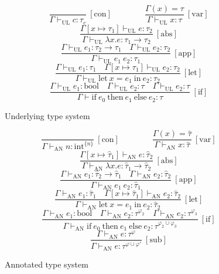\documentclass[a4paper]{report}
\begin{document}
\begin{figure}[p]
\[\frac{}{\Gamma \vdash_{\mathrm{UL}} c : \tau_c}\ \mathrm{[con]} \quad\quad\quad\quad
\frac{\Gamma(x) = \tau}{\Gamma \vdash_{\mathrm{UL}} x : \tau}\ \mathrm{[var]}\]
\[\frac{\Gamma[x \mapsto \tau_1] \vdash_{\mathrm{UL}} e : \tau_2}{\Gamma \vdash_{\mathrm{UL}} \lambda x. e : \tau_1 \to \tau_2}\ \mathrm{[abs]}\]
\[\frac{\Gamma \vdash_{\mathrm{UL}} e_1 : \tau_2 \to \tau_1 \quad \Gamma \vdash_{\mathrm{UL}} e_2 : \tau_2}{\Gamma \vdash_{\mathrm{UL}} e_1\ e_2 : \tau_1}\ \mathrm{[app]}\]
\[\frac{\Gamma \vdash_{\mathrm{UL}} e_1 : \tau_1 \quad \Gamma[x\mapsto \tau_1] \vdash_{\mathrm{UL}} e_2 : \tau_2}{\Gamma \vdash_{\mathrm{UL}} \mathrm{let\ } x = e_1 \mathrm{\ in\ } e_2 : \tau_2}\ \mathrm{[let]}\]
\[\frac{\Gamma \vdash_{\mathrm{UL}} e_1 : \mathrm{bool} \quad \Gamma \vdash_{\mathrm{UL}} e_2 : \tau \quad \Gamma \vdash_{\mathrm{UL}} e_2 : \tau}{\Gamma \vdash \mathrm{if\ } e_0 \mathrm{\ then\ } e_1 \mathrm{\ else \ } e_2 : \tau}\ \mathrm{[if]}\]
\caption{Underlying type system}
\label{underlying}
\end{figure}

\begin{figure}[p]
\[\frac{}{\Gamma \vdash_{\mathrm{AN}} n : \mathrm{int}^{\{n\}}}\ \mathrm{[con]} \quad\quad\quad\quad
\frac{\Gamma(x) = \widehat\tau}{\Gamma \vdash_{\mathrm{AN}} x : \widehat\tau}\ \mathrm{[var]}\]
\[\frac{\Gamma[x \mapsto \widehat\tau_1] \vdash_{\mathrm{AN}} e : \widehat\tau_2}{\Gamma \vdash_{\mathrm{AN}} \lambda x. e : \widehat\tau_1 \to \widehat\tau_2}\ \mathrm{[abs]}\]
\[\frac{\Gamma \vdash_{\mathrm{AN}} e_1 : \widehat\tau_2 \to \widehat\tau_1 \quad \Gamma \vdash_{\mathrm{AN}} e_2 : \widehat\tau_2}{\Gamma \vdash_{\mathrm{AN}} e_1\ e_2 : \widehat\tau_1}\ \mathrm{[app]}\]
\[\frac{\Gamma \vdash_{\mathrm{AN}} e_1 : \widehat\tau_1 \quad \Gamma[x\mapsto \widehat\tau_1] \vdash_{\mathrm{AN}} e_2 : \widehat\tau_2}{\Gamma \vdash_{\mathrm{AN}} \mathrm{let\ } x = e_1 \mathrm{\ in\ } e_2 : \widehat\tau_2}\ \mathrm{[let]}\]
\[\frac{\Gamma \vdash_{\mathrm{AN}} e_1 : \mathrm{bool} \quad \Gamma \vdash_{\mathrm{AN}} e_2 : \tau^{\varphi_2} \quad \Gamma \vdash_{\mathrm{AN}} e_2 : \tau^{\varphi_3}}{\Gamma \vdash_{\mathrm{AN}} \mathrm{if\ } e_0 \mathrm{\ then\ } e_1 \mathrm{\ else \ } e_2 : \tau^{\varphi_2 \cup \varphi_3}}\ \mathrm{[if]}\]
\[\frac{
\Gamma \vdash_{\mathrm{AN}} e : \tau^{\varphi}
}{
\Gamma \vdash_{\mathrm{AN}} e : \tau^{\varphi \cup \varphi'}
}\ \mathrm{[sub]}\]
\caption{Annotated type system}
\label{annotated}
\end{figure}
\end{document}
